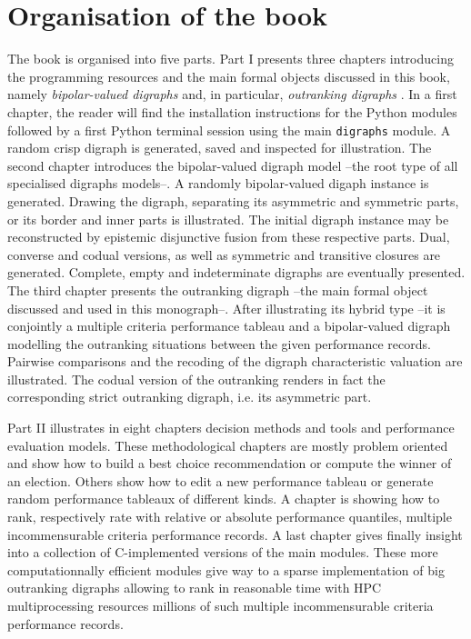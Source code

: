 \section{Organisation of the book}
\label{sec:0.2}

The book is organised into five parts. Part I presents three chapters introducing the \Digraph programming resources and the main formal objects discussed in this book, namely \emph{bipolar-valued digraphs} and, in particular, \emph{outranking digraphs} \citep{BIS-2021}. In a first chapter, the reader will find the installation instructions for the \Digraph Python modules followed by a first Python terminal session using the main \texttt{digraphs} module. A random crisp digraph is generated, saved and inspected for illustration. The second chapter introduces the bipolar-valued digraph model --the root type of all specialised digraphs models--. A randomly bipolar-valued digaph instance is generated. Drawing the digraph, separating its asymmetric and symmetric parts, or its border and inner parts is illustrated. The initial digraph instance may be reconstructed by epistemic disjunctive fusion from these respective parts. Dual, converse and codual versions, as well as symmetric and transitive closures are generated. Complete, empty and indeterminate digraphs are eventually presented. The third chapter presents the outranking digraph --the main formal object discussed and used in this monograph--. After illustrating its hybrid type --it is conjointly a multiple criteria performance tableau and a bipolar-valued digraph modelling the outranking situations between the given performance records. Pairwise comparisons and the recoding of the digraph characteristic valuation are illustrated. The codual version of the outranking renders in fact the corresponding strict outranking digraph, i.e. its asymmetric part. 

Part II illustrates in eight chapters decision methods and tools and performance evaluation models. These methodological chapters are mostly problem oriented and show how to build a best choice recommendation or compute the winner of an election. Others show how to edit a new performance tableau or generate random performance tableaux of different kinds. A chapter is showing how to rank, respectively rate with relative or absolute performance quantiles, multiple incommensurable criteria performance records. A last chapter gives finally insight into a collection of C-implemented versions of the main \Digraph modules. These more computationnally efficient modules give way to a sparse implementation of big outranking digraphs allowing to rank in reasonable time with HPC multiprocessing resources millions of such multiple incommensurable criteria performance records.

